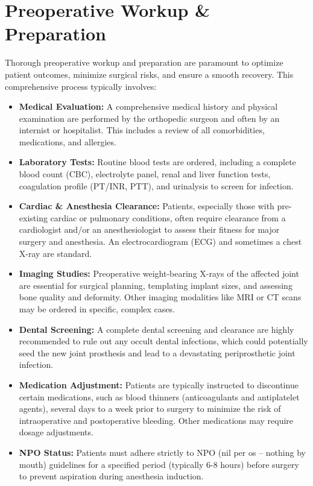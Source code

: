 \section*{Preoperative Workup \& Preparation}
Thorough preoperative workup and preparation are paramount to optimize patient outcomes, minimize surgical risks, and ensure a smooth recovery. This comprehensive process typically involves:

\begin{itemize}
  \item \textbf{Medical Evaluation:} A comprehensive medical history and physical examination are performed by the orthopedic surgeon and often by an internist or hospitalist. This includes a review of all comorbidities, medications, and allergies.
  \item \textbf{Laboratory Tests:} Routine blood tests are ordered, including a complete blood count (CBC), electrolyte panel, renal and liver function tests, coagulation profile (PT/INR, PTT), and urinalysis to screen for infection.
  \item \textbf{Cardiac \& Anesthesia Clearance:} Patients, especially those with pre-existing cardiac or pulmonary conditions, often require clearance from a cardiologist and/or an anesthesiologist to assess their fitness for major surgery and anesthesia. An electrocardiogram (ECG) and sometimes a chest X-ray are standard.
  \item \textbf{Imaging Studies:} Preoperative weight-bearing X-rays of the affected joint are essential for surgical planning, templating implant sizes, and assessing bone quality and deformity. Other imaging modalities like MRI or CT scans may be ordered in specific, complex cases.
  \item \textbf{Dental Screening:} A complete dental screening and clearance are highly recommended to rule out any occult dental infections, which could potentially seed the new joint prosthesis and lead to a devastating periprosthetic joint infection.
  \item \textbf{Medication Adjustment:} Patients are typically instructed to discontinue certain medications, such as blood thinners (anticoagulants and antiplatelet agents), several days to a week prior to surgery to minimize the risk of intraoperative and postoperative bleeding. Other medications may require dosage adjustments.
  \item \textbf{NPO Status:} Patients must adhere strictly to NPO (nil per os -- nothing by mouth) guidelines for a specified period (typically 6-8 hours) before surgery to prevent aspiration during anesthesia induction.

\end{itemize}
